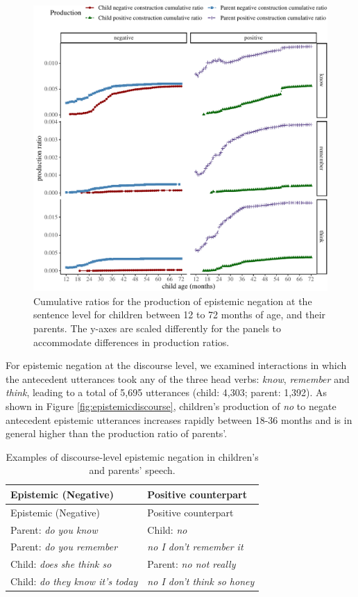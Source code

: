 \documentclass[
  english,
  man,floatsintext]{apa6}
\begin{document}
\begin{figure}[H]

{\centering \includegraphics{neg_construction_article_files/figure-latex/epistemic-1} 

}

\caption{Cumulative ratios for the production of epistemic negation at the sentence level for children between 12 to 72 months of age, and their parents. The y-axes are scaled differently for the panels to accommodate differences in production ratios.}\label{fig:epistemic}
\end{figure}

For epistemic negation at the discourse level, we examined interactions in which the antecedent utterances took any of the three head verbs: \emph{know}, \emph{remember} and \emph{think}, leading to a total of 5,695 utterances (child: 4,303; parent: 1,392). As shown in Figure \ref{fig:epistemicdiscourse}, children's production of \emph{no} to negate antecedent epistemic utterances increases rapidly between 18-36 months and is in general higher than the production ratio of parents'.

\begin{longtable}[]{@{}ll@{}}
\caption{\label{tab:epistem} Examples of discourse-level epistemic negation in children's and parents' speech.}\tabularnewline
\toprule
Epistemic (Negative) & Positive counterpart \\
\midrule
\endfirsthead
\toprule
Epistemic (Negative) & Positive counterpart \\
\midrule
\endhead
Parent: \emph{do you know} & Child: \emph{no} \\
Parent: \emph{do you remember} & \emph{no I don't remember it} \\
Child: \emph{does she think so} & Parent: \emph{no not really} \\
Child: \emph{do they know it's today} & \emph{no I don't think so honey} \\
\bottomrule
\end{longtable}
\end{document}

